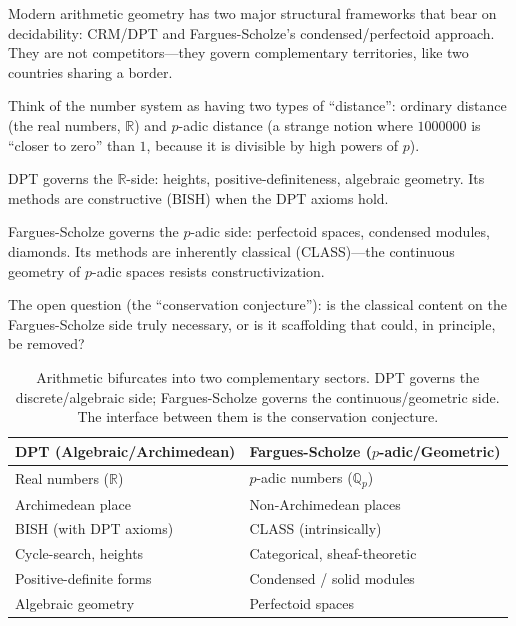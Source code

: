 \documentclass[11pt,twoside,openany]{report}
\theoremstyle{remark}
\newcommand{\BISH}{\textsf{BISH}}
\newcommand{\CLASS}{\textsf{CLASS}}
\begin{document}
Modern arithmetic geometry has two major structural frameworks that bear on decidability: CRM/DPT and Fargues-Scholze's condensed/perfectoid approach. They are not competitors---they govern complementary territories, like two countries sharing a border.

\begin{analogybox}
Think of the number system as having two types of ``distance'': ordinary distance (the real numbers, $\mathbb{R}$) and $p$-adic distance (a strange notion where $1000000$ is ``closer to zero'' than $1$, because it is divisible by high powers of $p$).

DPT governs the $\mathbb{R}$-side: heights, positive-definiteness, algebraic geometry. Its methods are constructive (\BISH) when the DPT axioms hold.

Fargues-Scholze governs the $p$-adic side: perfectoid spaces, condensed modules, diamonds. Its methods are inherently classical (\CLASS)---the continuous geometry of $p$-adic spaces resists constructivization.

The open question (the ``conservation conjecture''): is the classical content on the Fargues-Scholze side truly necessary, or is it scaffolding that could, in principle, be removed?
\end{analogybox}

\begin{table}[htbp]
\centering\small
\caption{Arithmetic bifurcates into two complementary sectors. DPT governs the discrete/algebraic side; Fargues-Scholze governs the continuous/geometric side. The interface between them is the conservation conjecture.}
\label{tab:dpt-fs}
\renewcommand{\arraystretch}{1.3}
\begin{tabular}{@{}p{5.5cm} p{5.5cm}@{}}
\toprule
\textbf{DPT (Algebraic/Archimedean)} & \textbf{Fargues-Scholze ($p$-adic/Geometric)} \\
\midrule
\rowcolor{green!6}
Real numbers ($\mathbb{R}$) & $p$-adic numbers ($\mathbb{Q}_p$) \\
\rowcolor{green!6}
Archimedean place & Non-Archimedean places \\
\rowcolor{green!6}
\BISH{} (with DPT axioms) & \CLASS{} (intrinsically) \\
Cycle-search, heights & Categorical, sheaf-theoretic \\
Positive-definite forms & Condensed / solid modules \\
Algebraic geometry & Perfectoid spaces \\
\bottomrule
\end{tabular}
\end{table}
\end{document}
